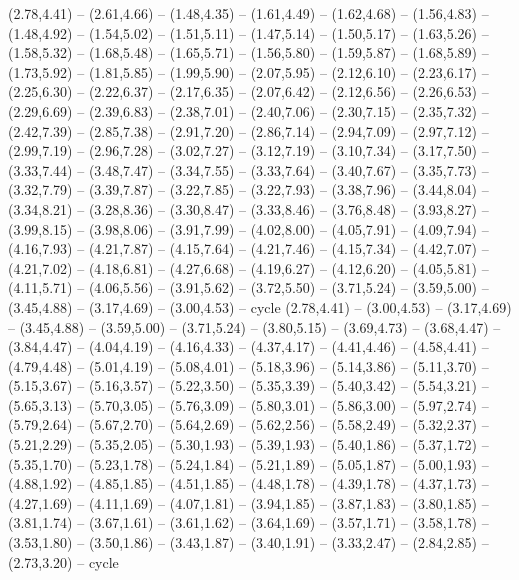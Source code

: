 \expandafter\def\csname geo:gebiet:1945-UK\endcsname{
  (2.78,4.41) -- (2.61,4.66) -- (1.48,4.35) -- (1.61,4.49) -- (1.62,4.68) -- (1.56,4.83) -- (1.48,4.92) -- (1.54,5.02) -- (1.51,5.11) -- (1.47,5.14) -- (1.50,5.17) -- (1.63,5.26) -- (1.58,5.32) -- (1.68,5.48) -- (1.65,5.71) -- (1.56,5.80) -- (1.59,5.87) -- (1.68,5.89) -- (1.73,5.92) -- (1.81,5.85) -- (1.99,5.90) -- (2.07,5.95) -- (2.12,6.10) -- (2.23,6.17) -- (2.25,6.30) -- (2.22,6.37) -- (2.17,6.35) -- (2.07,6.42) -- (2.12,6.56) -- (2.26,6.53) -- (2.29,6.69) -- (2.39,6.83) -- (2.38,7.01) -- (2.40,7.06) -- (2.30,7.15) -- (2.35,7.32) -- (2.42,7.39) -- (2.85,7.38) -- (2.91,7.20) -- (2.86,7.14) -- (2.94,7.09) -- (2.97,7.12) -- (2.99,7.19) -- (2.96,7.28) -- (3.02,7.27) -- (3.12,7.19) -- (3.10,7.34) -- (3.17,7.50) -- (3.33,7.44) -- (3.48,7.47) -- (3.34,7.55) -- (3.33,7.64) -- (3.40,7.67) -- (3.35,7.73) -- (3.32,7.79) -- (3.39,7.87) -- (3.22,7.85) -- (3.22,7.93) -- (3.38,7.96) -- (3.44,8.04) -- (3.34,8.21) -- (3.28,8.36) -- (3.30,8.47) -- (3.33,8.46) -- (3.76,8.48) -- (3.93,8.27) -- (3.99,8.15) -- (3.98,8.06) -- (3.91,7.99) -- (4.02,8.00) -- (4.05,7.91) -- (4.09,7.94) -- (4.16,7.93) -- (4.21,7.87) -- (4.15,7.64) -- (4.21,7.46) -- (4.15,7.34) -- (4.42,7.07) -- (4.21,7.02) -- (4.18,6.81) -- (4.27,6.68) -- (4.19,6.27) -- (4.12,6.20) -- (4.05,5.81) -- (4.11,5.71) -- (4.06,5.56) -- (3.91,5.62) -- (3.72,5.50) -- (3.71,5.24) -- (3.59,5.00) -- (3.45,4.88) -- (3.17,4.69) -- (3.00,4.53) -- cycle}
\expandafter\def\csname geo:gebiet:1945-USA\endcsname{
  (2.78,4.41) -- (3.00,4.53) -- (3.17,4.69) -- (3.45,4.88) -- (3.59,5.00) -- (3.71,5.24) -- (3.80,5.15) -- (3.69,4.73) -- (3.68,4.47) -- (3.84,4.47) -- (4.04,4.19) -- (4.16,4.33) -- (4.37,4.17) -- (4.41,4.46) -- (4.58,4.41) -- (4.79,4.48) -- (5.01,4.19) -- (5.08,4.01) -- (5.18,3.96) -- (5.14,3.86) -- (5.11,3.70) -- (5.15,3.67) -- (5.16,3.57) -- (5.22,3.50) -- (5.35,3.39) -- (5.40,3.42) -- (5.54,3.21) -- (5.65,3.13) -- (5.70,3.05) -- (5.76,3.09) -- (5.80,3.01) -- (5.86,3.00) -- (5.97,2.74) -- (5.79,2.64) -- (5.67,2.70) -- (5.64,2.69) -- (5.62,2.56) -- (5.58,2.49) -- (5.32,2.37) -- (5.21,2.29) -- (5.35,2.05) -- (5.30,1.93) -- (5.39,1.93) -- (5.40,1.86) -- (5.37,1.72) -- (5.35,1.70) -- (5.23,1.78) -- (5.24,1.84) -- (5.21,1.89) -- (5.05,1.87) -- (5.00,1.93) -- (4.88,1.92) -- (4.85,1.85) -- (4.51,1.85) -- (4.48,1.78) -- (4.39,1.78) -- (4.37,1.73) -- (4.27,1.69) -- (4.11,1.69) -- (4.07,1.81) -- (3.94,1.85) -- (3.87,1.83) -- (3.80,1.85) -- (3.81,1.74) -- (3.67,1.61) -- (3.61,1.62) -- (3.64,1.69) -- (3.57,1.71) -- (3.58,1.78) -- (3.53,1.80) -- (3.50,1.86) -- (3.43,1.87) -- (3.40,1.91) -- (3.33,2.47) -- (2.84,2.85) -- (2.73,3.20) -- cycle}
